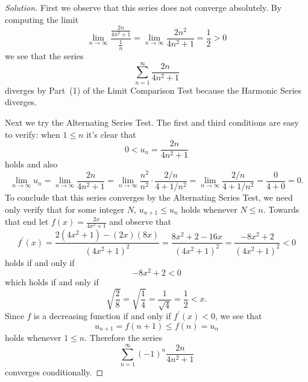 \documentclass[12pt]{amsart}
\begin{document}
\begin{proof}[Solution]
  First we observe that this series does not converge absolutely.
  By computing the limit
  \[\lim_{n \to \infty} \frac{\frac{2n}{4n^2 + 1}}{\frac{1}{n}} = \lim_{n \to \infty} \frac{2n^2}{4n^2 + 1} = \frac{1}{2} > 0\]
  we see that the series
  \[\sum_{n = 1}^\infty \frac{2n}{4n^2 + 1}\]
  diverges by Part~(1) of the Limit Comparison Test because the Harmonic Series diverges.

  Next we try the Alternating Series Test.
  The first and third conditions are easy to verify: when \(1 \leq n\) it's clear that
  \[0 < u_n = \frac{2n}{4n^2 + 1}\]
  holds and also
  \[\lim_{n \to \infty} u_n = \lim_{n \to \infty} \frac{2n}{4n^2 + 1} = \lim_{n \to \infty} \frac{n^2}{n^2} \cdot \frac{2/n}{4 + 1/n^2} = \lim_{n \to \infty} \frac{2/n}{4 + 1/n^2} = \frac{0}{4 + 0} = 0.\]
  To conclude that this series converges by the Alternating Series Test, we need only verify that for some integer \(N\), \(u_{n + 1} \leq u_n\) holds whenever \(N \leq n\).
  Towards that end let \(f(x) = \frac{2x}{4x^2 + 1}\) and observe that
  \[f^\prime(x) = \frac{2(4x^2 + 1) - (2x)(8x)}{(4x^2 + 1)^2} = \frac{8x^2 + 2 - 16x}{(4x^2 + 1)^2} = \frac{-8x^2 + 2}{(4x^2 + 1)^2} < 0\]
  holds if and only if
  \[-8x^2 +2 < 0\]
  which holds if and only if
  \[\sqrt{\frac{2}{8}} = \sqrt{\frac{1}{4}} = \frac{1}{\sqrt{4}} = \frac{1}{2} < x.\]
  Since \(f\) is a decreasing function if and only if \(f^\prime(x) < 0\), we see that
  \[u_{n + 1} = f(n + 1) \leq f(n) = u_n\]
  holds whenever \(1 \leq n\).
  Therefore the series
  \[\sum_{n = 1}^\infty (-1)^n\frac{2n}{4n^2 + 1}\]
  converges conditionally.
\end{proof}
\end{document}
